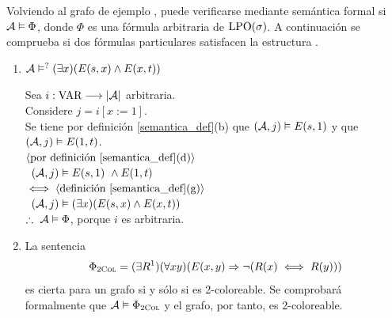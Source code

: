 Volviendo al grafo de ejemplo \A, puede verificarse mediante semántica 
formal si $\mathcal{A}\vDash\Phi$, donde $\Phi$
es una fórmula arbitraria de $\text{LPO}(\sigma)$. A continuación se comprueba si dos
fórmulas particulares satisfacen la estructura \A. 

\begin{enumerate}
\item $\mathcal{A}\vDash^?(\exists x)(E(s,x)\land E(x,t))$

Sea $i : \text{VAR} \longrightarrow |\mathcal{A}|$ arbitraria.\\
Considere $j = i[x:=1]$.\\
Se tiene por definición \ref{semantica_def}(b) que $(\mathcal{A},j) \vDash E(s,1)$ y que $(\mathcal{A},j) \vDash E(1,t)$.\\
$\langle \text{por definición \ref{semantica_def}(d)} \rangle$\\
\mbox{\hspace{5mm} $(\mathcal{A},j) \vDash E(s,1)\ \land E(1,t)$}\\
$\iff \langle \text{definición \ref{semantica_def}(g)} \rangle$\\
\mbox{\hspace{5mm} $(\mathcal{A},j) \vDash (\exists x)(E(s,x) \land E(x,t))$}\\
$\therefore\ \mathcal{A} \vDash \Phi$, porque $i$ es arbitraria.

\item La sentencia
\[ \Phi_{\textsc{2Col}} = (\exists R^1)(\forall xy)(E(x,y)\Rightarrow \neg (R(x) \iff R(y))) \]
es cierta para un grafo si y sólo si es 2-coloreable. Se comprobará formalmente
que $\mathcal{A} \vDash \Phi_{\textsc{2Col}}$ y el grafo, por tanto, es 2-coloreable.


\end{enumerate}
